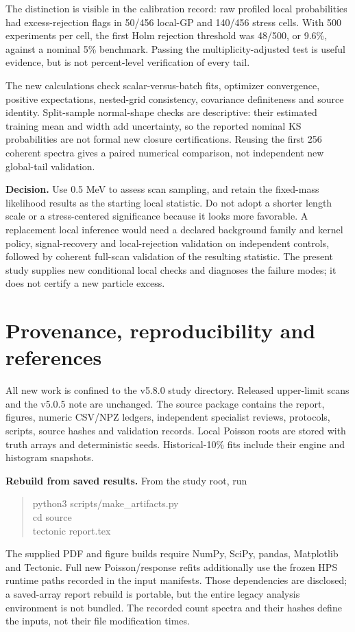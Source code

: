 \documentclass[11pt]{article}
\newcommand{\pageheading}[1]{\section*{\color{navy}#1}}
\begin{document}
The distinction is visible in the calibration record: raw profiled local probabilities had excess-rejection flags in 50/456 local-GP and 140/456 stress cells. With 500 experiments per cell, the first Holm rejection threshold was 48/500, or 9.6\%, against a nominal 5\% benchmark. Passing the multiplicity-adjusted test is useful evidence, but is not percent-level verification of every tail.

The new calculations check scalar-versus-batch fits, optimizer convergence, positive expectations, nested-grid consistency, covariance definiteness and source identity. Split-sample normal-shape checks are descriptive: their estimated training mean and width add uncertainty, so the reported nominal KS probabilities are not formal new closure certifications. Reusing the first 256 coherent spectra gives a paired numerical comparison, not independent new global-tail validation.

\textbf{Decision.} Use 0.5 MeV to assess scan sampling, and retain the fixed-mass likelihood results as the starting local statistic. Do not adopt a shorter length scale or a stress-centered significance because it looks more favorable. A replacement local inference would need a declared background family and kernel policy, signal-recovery and local-rejection validation on independent controls, followed by coherent full-scan validation of the resulting statistic. The present study supplies new conditional local checks and diagnoses the failure modes; it does not certify a new particle excess.

\clearpage
\pageheading{Provenance, reproducibility and references}
\small


All new work is confined to the v5.8.0 study directory. Released upper-limit scans and the v5.0.5 note are unchanged. The source package contains the report, figures, numeric CSV/NPZ ledgers, independent specialist reviews, protocols, scripts, source hashes and validation records. Local Poisson roots are stored with truth arrays and deterministic seeds. Historical-10\% fits include their engine and histogram snapshots.

\textbf{Rebuild from saved results.} From the study root, run
\begin{quote}\ttfamily\small
python3 scripts/make\_artifacts.py\\
cd source\\
tectonic report.tex
\end{quote}
The supplied PDF and figure builds require NumPy, SciPy, pandas, Matplotlib and Tectonic. Full new Poisson/response refits additionally use the frozen HPS runtime paths recorded in the input manifests. Those dependencies are disclosed; a saved-array report rebuild is portable, but the entire legacy analysis environment is not bundled. The recorded count spectra and their hashes define the inputs, not their file modification times.
\end{document}

